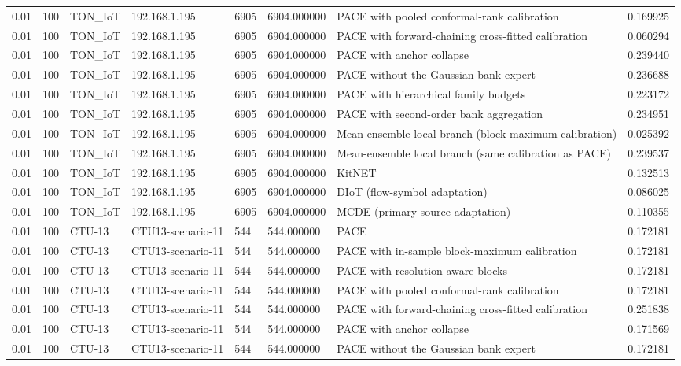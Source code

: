 \begin{tabular}{llllllll}
0.01 & 100 & TON\_IoT & 192.168.1.195 & 6905 & 6904.000000 & PACE with pooled conformal-rank calibration & 0.169925 \\
0.01 & 100 & TON\_IoT & 192.168.1.195 & 6905 & 6904.000000 & PACE with forward-chaining cross-fitted calibration & 0.060294 \\
0.01 & 100 & TON\_IoT & 192.168.1.195 & 6905 & 6904.000000 & PACE with anchor collapse & 0.239440 \\
0.01 & 100 & TON\_IoT & 192.168.1.195 & 6905 & 6904.000000 & PACE without the Gaussian bank expert & 0.236688 \\
0.01 & 100 & TON\_IoT & 192.168.1.195 & 6905 & 6904.000000 & PACE with hierarchical family budgets & 0.223172 \\
0.01 & 100 & TON\_IoT & 192.168.1.195 & 6905 & 6904.000000 & PACE with second-order bank aggregation & 0.234951 \\
0.01 & 100 & TON\_IoT & 192.168.1.195 & 6905 & 6904.000000 & Mean-ensemble local branch (block-maximum calibration) & 0.025392 \\
0.01 & 100 & TON\_IoT & 192.168.1.195 & 6905 & 6904.000000 & Mean-ensemble local branch (same calibration as PACE) & 0.239537 \\
0.01 & 100 & TON\_IoT & 192.168.1.195 & 6905 & 6904.000000 & KitNET & 0.132513 \\
0.01 & 100 & TON\_IoT & 192.168.1.195 & 6905 & 6904.000000 & DIoT (flow-symbol adaptation) & 0.086025 \\
0.01 & 100 & TON\_IoT & 192.168.1.195 & 6905 & 6904.000000 & MCDE (primary-source adaptation) & 0.110355 \\
0.01 & 100 & CTU-13 & CTU13-scenario-11 & 544 & 544.000000 & PACE & 0.172181 \\
0.01 & 100 & CTU-13 & CTU13-scenario-11 & 544 & 544.000000 & PACE with in-sample block-maximum calibration & 0.172181 \\
0.01 & 100 & CTU-13 & CTU13-scenario-11 & 544 & 544.000000 & PACE with resolution-aware blocks & 0.172181 \\
0.01 & 100 & CTU-13 & CTU13-scenario-11 & 544 & 544.000000 & PACE with pooled conformal-rank calibration & 0.172181 \\
0.01 & 100 & CTU-13 & CTU13-scenario-11 & 544 & 544.000000 & PACE with forward-chaining cross-fitted calibration & 0.251838 \\
0.01 & 100 & CTU-13 & CTU13-scenario-11 & 544 & 544.000000 & PACE with anchor collapse & 0.171569 \\
0.01 & 100 & CTU-13 & CTU13-scenario-11 & 544 & 544.000000 & PACE without the Gaussian bank expert & 0.172181 \\

\end{tabular}
